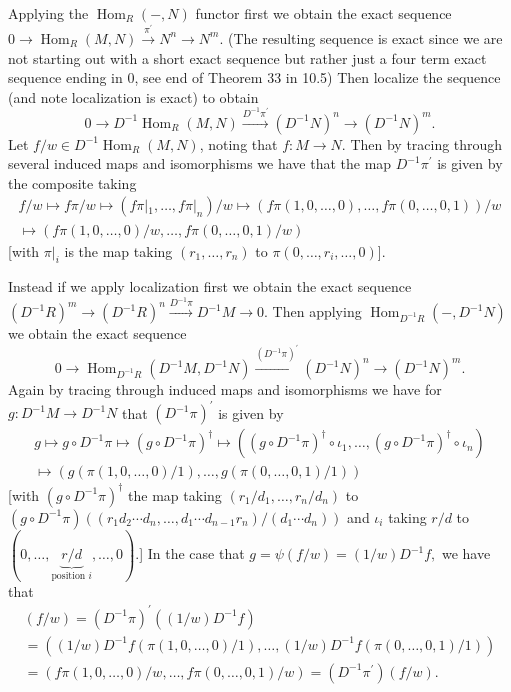 \documentclass[11pt]{article}
\DeclareMathOperator{\Hom}{Hom}
\begin{document}
\begin{enumerate}[label=(\alph*)]
  Applying the $\Hom_R(-,N)$ functor first we obtain the exact sequence $0\to \Hom_R(M,N)\xrightarrow{\pi^\prime}N^n\to N^m$. (The resulting sequence is exact since we are not starting out with a short exact sequence but rather just a four term exact sequence ending in $0$, see end of Theorem 33 in 10.5) Then localize the sequence (and note localization is exact) to obtain \[0\to D^{-1}\Hom_R(M,N)\xrightarrow{D^{-1}\pi^\prime}(D^{-1}N)^n\to (D^{-1}N)^m.\] Let $f/w\in D^{-1}\Hom_R(M,N)$, noting that $f\colon M\to N$. Then by tracing through several induced maps and isomorphisms we have that the map $D^{-1}\pi^\prime$ is given by the composite taking \begin{multline*}
    f/w\mapsto f\pi/w\mapsto (f\pi|_1,\dots,f\pi|_n)/w\mapsto (f\pi(1,0,\dots,0),\dots,f\pi(0,\dots,0,1))/w \\\mapsto (f\pi(1,0,\dots,0)/w,\dots,f\pi(0,\dots,0,1)/w)
  \end{multline*} [with $\pi|_i$ is the map taking $(r_1,\dots,r_n)$ to $\pi(0,\dots,r_i,\dots,0)$].

  Instead if we apply localization first we obtain the exact sequence $(D^{-1}R)^m\to (D^{-1}R)^n\xrightarrow{D^{-1}\pi} D^{-1}M\to 0$. Then applying $\Hom_{D^{-1}R}(-,D^{-1}N)$ we obtain the exact sequence \[0\to \Hom_{D^{-1}R}(D^{-1}M,D^{-1}N)\xrightarrow{(D^{-1}\pi)^\prime}(D^{-1}N)^n\to (D^{-1}N)^m.\] Again by tracing through induced maps and isomorphisms we have for $g\colon D^{-1}M\to D^{-1}N$ that $(D^{-1}\pi)^\prime$ is given by \begin{multline*}
    g\mapsto g\circ D^{-1}\pi\mapsto (g\circ D^{-1}\pi)^\dagger\mapsto ((g\circ D^{-1}\pi)^\dagger\circ \iota_1,\dots,(g\circ D^{-1}\pi)^\dagger\circ \iota_n)\\ \mapsto (g(\pi(1,0,\dots,0)/1),\dots,g(\pi(0,\dots,0,1)/1))
  \end{multline*} [with $(g\circ D^{-1}\pi)^\dagger$ the map taking $(r_1/d_1,\dots,r_n/d_n)$ to $(g\circ D^{-1}\pi)((r_1d_2\cdots d_n, \dots, d_1\cdots d_{n-1}r_n)/(d_1\cdots d_n))$ and $\iota_i$ taking $r/d$ to $(0,\dots,\underbrace{r/d}_{\text{position }i},\dots,0)$.] In the case that $g = \psi(f/w) = (1/w)D^{-1}f, $ we have that \begin{multline*}
    [(D^{-1}\pi)^\prime\circ \psi](f/w) = (D^{-1}\pi)^\prime((1/w)D^{-1}f) \\= ((1/w)D^{-1}f(\pi(1,0,\dots,0)/1),\dots,(1/w)D^{-1}f(\pi(0,\dots,0,1)/1))\\ = (f\pi(1,0,\dots,0)/w,\dots,f\pi(0,\dots,0,1)/w) = (D^{-1}\pi^\prime)(f/w).
  \end{multline*}


\end{enumerate}
\end{document}

